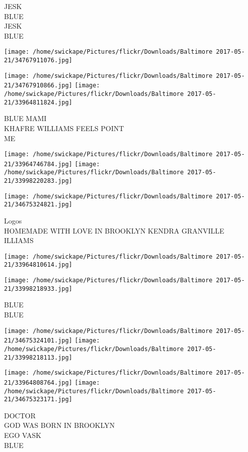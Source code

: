 \documentclass[10pt,letterpaper]{article}
\begin{document}
JESK\\
BLUE\\
JESK\\
BLUE
\pagebreak

\texttt{[image: /home/swickape/Pictures/flickr/Downloads/Baltimore 2017-05-21/34767911076.jpg]}

\vspace{0.25in}
\texttt{[image: /home/swickape/Pictures/flickr/Downloads/Baltimore 2017-05-21/34767910866.jpg]}
\texttt{[image: /home/swickape/Pictures/flickr/Downloads/Baltimore 2017-05-21/33964811824.jpg]}

BLUE MAMI\\
KHAFRE WILLIAMS FEELS POINT\\
ME
\pagebreak

\texttt{[image: /home/swickape/Pictures/flickr/Downloads/Baltimore 2017-05-21/33964746784.jpg]}
\texttt{[image: /home/swickape/Pictures/flickr/Downloads/Baltimore 2017-05-21/33998220283.jpg]}

\texttt{[image: /home/swickape/Pictures/flickr/Downloads/Baltimore 2017-05-21/34675324821.jpg]}

Logos\\
HOMEMADE WITH LOVE IN BROOKLYN KENDRA GRANVILLE\\
ILLIAMS
\pagebreak

\texttt{[image: /home/swickape/Pictures/flickr/Downloads/Baltimore 2017-05-21/33964810614.jpg]}

\vspace{0.25in}
\texttt{[image: /home/swickape/Pictures/flickr/Downloads/Baltimore 2017-05-21/33998218933.jpg]}

BLUE\\
BLUE
\pagebreak

\texttt{[image: /home/swickape/Pictures/flickr/Downloads/Baltimore 2017-05-21/34675324101.jpg]}
\texttt{[image: /home/swickape/Pictures/flickr/Downloads/Baltimore 2017-05-21/33998218113.jpg]}

\texttt{[image: /home/swickape/Pictures/flickr/Downloads/Baltimore 2017-05-21/33964808764.jpg]}
\texttt{[image: /home/swickape/Pictures/flickr/Downloads/Baltimore 2017-05-21/34675323171.jpg]}

DOCTOR\\
GOD WAS BORN IN BROOKLYN\\
EGO VASK\\
BLUE
\pagebreak
\end{document}
